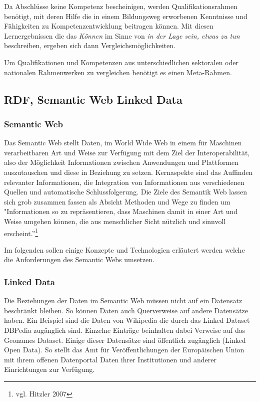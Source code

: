 Da Abschlüsse keine Kompetenz bescheinigen, werden Qualifikationsrahmen benötigt, mit deren Hilfe die in einem Bildungsweg erworbenen Kenntnisse und Fähigkeiten zu Kompetenzentwicklung beitragen können. Mit diesen Lernergebnissen die das \emph{Können} im Sinne von \emph{in der Lage sein, etwas zu tun} beschreiben, ergeben sich dann Vergleichsmöglichkeiten.
\vspace{1em}

Um Qualifikationen und Kompetenzen aus unterschiedlichen sektoralen oder nationalen Rahmenwerken zu vergleichen benötigt es einen Meta-Rahmen. 
\vspace{6em}


\subsection{RDF, Semantic Web  Linked Data}\label{semantic_web}
\subsubsection{Semantic Web}
Das Semantic Web stellt Daten, im World Wide Web in einem für Maschinen verarbeitbaren Art und Weise zur Verfügung mit dem Ziel der Interoperabilität, also der Möglichkeit Informationen zwischen Anwendungen und Plattformen auszutauschen und diese in Beziehung zu setzen. Kernaspekte sind das Auffinden relevanter Informationen, die Integration von Informationen aus verschiedenen Quellen und automatische Schlussfolgerung. Die Ziele des Semantik Web lassen sich grob zusammen fassen als Absicht Methoden und Wege zu finden um "Informationen so zu repräsentieren, dass Maschinen damit in einer Art und Weise umgehen können, die aus menschlicher Sicht nützlich und sinnvoll erscheint.”\footnote{ vgl. Hitzler 2007\cite[12]{Hitzler2007}}\newline
 
Im folgenden sollen einige Konzepte und Technologien erläutert werden welche die Anforderungen des Semantic Webs umsetzen.
 
\subsubsection{Linked Data}

Die Beziehungen der Daten im Semantic Web müssen nicht auf ein Datensatz beschränkt bleiben. So können Daten auch Querverweise auf andere Datensätze haben. Ein Beispiel sind die Daten von Wikipedia die durch das Linked Dataset DBPedia zugänglich sind. Einzelne Einträge beinhalten dabei Verweise auf das Geonames Dataset.
Einige dieser Datensätze sind öffentlich zugänglich (Linked Open Data). So stellt das Amt für Veröffentlichungen der Europäischen Union mit ihrem offenen Datenportal Daten ihrer Institutionen und anderer Einrichtungen zur Verfügung. \newline
 
